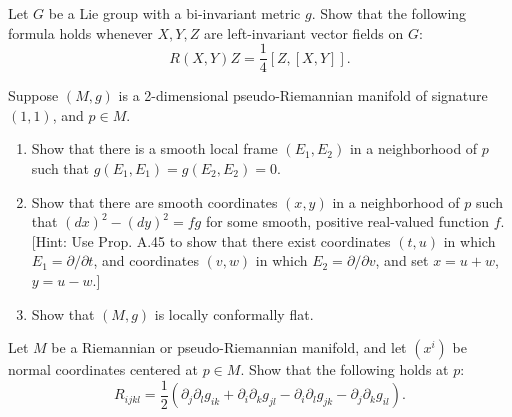 \begin{exercise}
\label{prob:lie-group-curvature}
Let $G$ be a Lie group with a bi-invariant metric $g$. Show that the following formula holds whenever $X, Y, Z$ are left-invariant vector fields on $G$:
\[
R(X,Y)Z = \frac{1}{4}[Z,[X,Y]].
\]
\end{exercise}

\begin{exercise}
\label{prob:pseudo-riemannian-2d}
Suppose $(M, g)$ is a 2-dimensional pseudo-Riemannian manifold of signature $(1, 1)$, and $p \in M$.
\begin{enumerate}
\item[(a)] Show that there is a smooth local frame $(E_1, E_2)$ in a neighborhood of $p$ such that $g(E_1, E_1) = g(E_2, E_2) = 0$.
\item[(b)] Show that there are smooth coordinates $(x, y)$ in a neighborhood of $p$ such that $(dx)^2 - (dy)^2 = fg$ for some smooth, positive real-valued function $f$. [Hint: Use Prop. A.45 to show that there exist coordinates $(t,u)$ in which $E_1 = \partial/\partial t$, and coordinates $(v,w)$ in which $E_2 = \partial/\partial v$, and set $x = u + w$, $y = u - w$.]
\item[(c)] Show that $(M, g)$ is locally conformally flat.
\end{enumerate}
\end{exercise}

\begin{exercise}
\label{prob:ricci-in-normal-coordinates}
Let $M$ be a Riemannian or pseudo-Riemannian manifold, and let $(x^i)$ be normal coordinates centered at $p \in M$. Show that the following holds at $p$:
\[
R_{ijkl} = \frac{1}{2}\left(\partial_j \partial_l g_{ik} + \partial_i \partial_k g_{jl} - \partial_i \partial_l g_{jk} - \partial_j \partial_k g_{il}\right).
\]
\end{exercise}
